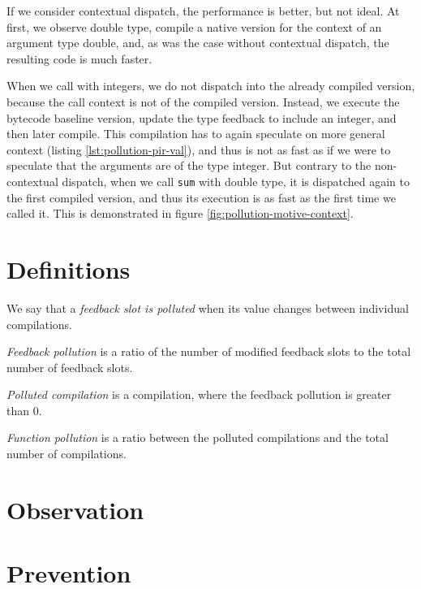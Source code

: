 If we consider contextual dispatch, the performance is better, but not ideal. At first, we observe double type, compile a native version for the context of an argument type double, and, as was the case without contextual dispatch, the resulting code is much faster.

When we call with integers, we do not dispatch into the already compiled version, because the call context is not  of the compiled version. Instead, we execute the bytecode baseline version, update the type feedback to include an integer, and then later compile. This compilation has to again speculate on more general context (listing \ref{lst:pollution-pir-val}), and thus is not as fast as if we were to speculate that the arguments are of the type integer. But contrary to the non-contextual dispatch, when we call \texttt{sum} with double type, it is dispatched again to the first compiled version, and thus its execution is as fast as the first time we called it. This is demonstrated in figure \ref{fig:pollution-motive-context}.

\section{Definitions}

We say that a \textit{feedback slot is polluted} when its value changes between individual compilations.

\textit{Feedback pollution} is a ratio of the number of modified feedback slots to the total number of feedback slots.

\textit{Polluted compilation} is a compilation, where the feedback pollution is greater than 0.

\textit{Function pollution} is a ratio between the polluted compilations and the total number of compilations.

\section{Observation}


\section{Prevention}


